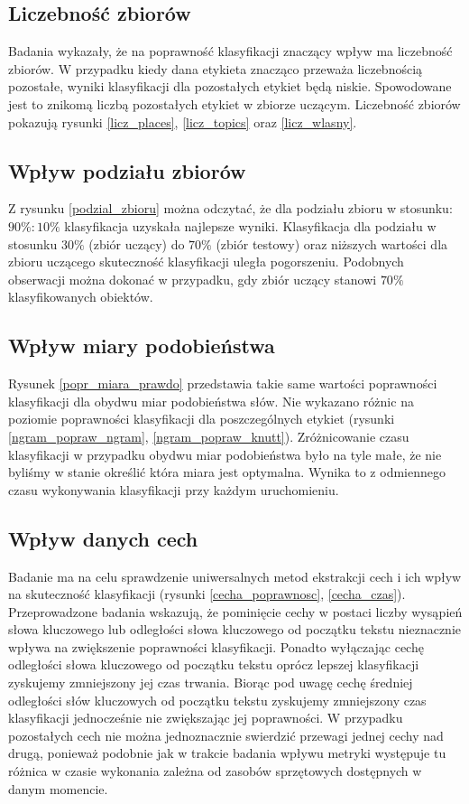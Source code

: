 \documentclass{classrep}
\begin{document}
\subsection{Liczebność zbiorów}
Badania wykazały, że na poprawność klasyfikacji znaczący wpływ ma liczebność zbiorów. W przypadku
kiedy dana etykieta znacząco przeważa liczebnością pozostałe, wyniki klasyfikacji dla pozostałych
etykiet będą niskie. Spowodowane jest to znikomą liczbą pozostałych etykiet w zbiorze uczącym.
Liczebność zbiorów pokazują rysunki \ref{licz_places}, \ref{licz_topics} oraz \ref{licz_wlasny}.

\subsection{Wpływ podziału zbiorów}
Z rysunku \ref{podzial_zbioru} można odczytać, że dla podziału zbioru w stosunku: $90\%:10\%$ klasyfikacja
uzyskała najlepsze wyniki.
Klasyfikacja dla podziału w stosunku $30\%$ (zbiór uczący) do $70\%$ (zbiór testowy) oraz niższych wartości dla zbioru uczącego
skuteczność klasyfikacji uległa pogorszeniu. Podobnych obserwacji można dokonać w przypadku, gdy
zbiór uczący stanowi $70\%$
klasyfikowanych obiektów.

\subsection{Wpływ miary podobieństwa}
Rysunek \ref{popr_miara_prawdo} przedstawia takie same wartości poprawności klasyfikacji dla obydwu
miar podobieństwa słów. Nie wykazano różnic na poziomie poprawności klasyfikacji dla poszczególnych
etykiet (rysunki \ref{ngram_popraw_ngram}, \ref{ngram_popraw_knutt}). Zróżnicowanie czasu klasyfikacji
w przypadku obydwu miar podobieństwa było na tyle małe, że nie byliśmy w stanie określić która
miara jest optymalna. Wynika to z odmiennego czasu wykonywania klasyfikacji przy każdym uruchomieniu.

\subsection{Wpływ danych cech}
Badanie ma na celu sprawdzenie uniwersalnych metod ekstrakcji cech i ich wpływ na skuteczność
klasyfikacji (rysunki \ref{cecha_poprawnosc}, \ref{cecha_czas}). Przeprowadzone badania wskazują,
że pominięcie cechy w postaci liczby wysąpień słowa kluczowego lub odległości słowa kluczowego od początku tekstu
nieznacznie wpływa na zwiększenie poprawności klasyfikacji. Ponadto wyłączając cechę odległości słowa
kluczowego od początku tekstu oprócz lepszej klasyfikacji zyskujemy zmniejszony jej czas trwania.
Biorąc pod uwagę cechę średniej odległości słów kluczowych od początku tekstu zyskujemy zmniejszony
czas klasyfikacji jednocześnie nie zwiększając jej poprawności. W przypadku pozostałych cech nie można
jednoznacznie swierdzić przewagi jednej cechy nad drugą, ponieważ podobnie jak w trakcie badania wpływu
metryki występuje tu różnica w czasie wykonania zależna od zasobów sprzętowych dostępnych w danym momencie.
\end{document}
